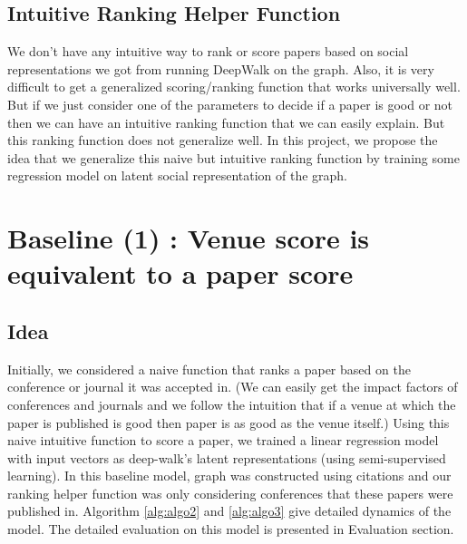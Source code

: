 \documentclass[a4paper, 11pt]{article}
\begin{document}
\subsection{Intuitive Ranking Helper Function}
We don't have any intuitive way to rank or score papers based on social representations we got from running DeepWalk on the graph. Also, it is very difficult to get a generalized scoring/ranking function that works universally well. But if we just consider one of the parameters to decide if a paper is good or not then we can have an intuitive ranking function that we can easily explain. But this ranking function does not generalize well. In this project, we propose the idea that we generalize this naive but intuitive ranking function by training some regression model on latent social representation of the graph. 

\section{Baseline (1) : Venue score is equivalent to a paper score}
\subsection{Idea}
Initially, we considered a naive function that ranks a paper based on the conference or journal it was accepted in. (We can easily get the impact factors of conferences and journals and we follow the intuition that if a venue at which the paper is published is good then paper is as good as the venue itself.) Using this naive intuitive function to score a paper, we trained a linear regression model with input vectors as deep-walk's latent representations (using semi-supervised learning). In this baseline model, graph was constructed using citations and our ranking helper function was only considering conferences that these papers were published in. Algorithm \ref{alg:algo2} and  \ref{alg:algo3} give detailed dynamics of the model. The detailed evaluation on this model is presented in Evaluation section.
\end{document}
